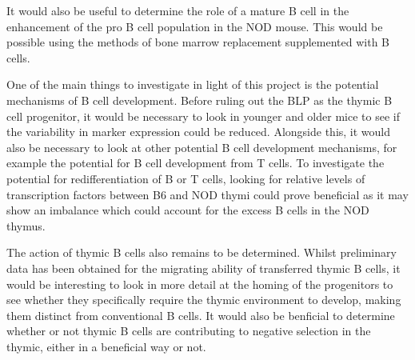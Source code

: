It would also be useful to determine the role of a mature B cell in the enhancement of the pro B cell population in the NOD mouse.
This would be possible using the methods of bone marrow replacement supplemented with B cells.

One of the main things to investigate in light of this project is the potential mechanisms of B cell development.
Before ruling out the BLP as the thymic B cell progenitor, it would be necessary to look in younger and older mice to see if the variability in marker expression could be reduced.
Alongside this, it would also be necessary to look at other potential B cell development mechanisms, for example the potential for B cell development from T cells.
To investigate the potential for redifferentiation of B or T cells, looking for relative levels of transcription factors between B6 and NOD thymi could prove beneficial as it may show an imbalance which could account for the excess B cells in the NOD thymus.

The action of thymic B cells also remains to be determined. 
Whilst preliminary data has been obtained for the migrating ability of transferred thymic B cells, it would be interesting to look in more detail at the homing of the progenitors to see whether they specifically require the thymic environment to develop, making them distinct from conventional B cells.
It would also be benficial to determine whether or not thymic B cells are contributing to negative selection in the thymic, either in a beneficial way or not.










